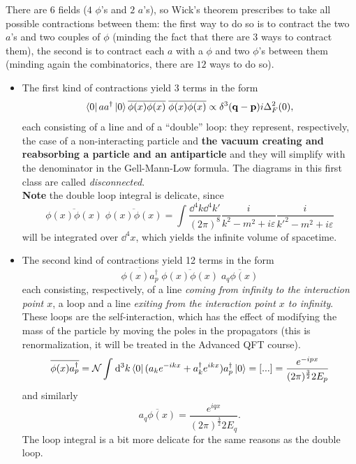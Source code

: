 There are $6$ fields ($4$ $\phi$'s and $2$ $a$'s), so Wick's theorem
prescribes to take all possible contractions between them: the first way to
do so is to contract the two $a$'s and two couples of $\phi$ (minding the fact
that there are $3$ ways to contract them), the second is to contract each $a$
with a $\phi$ and two $\phi$'s between them (minding again the combinatorics,
there are $12$ ways to do so).
\begin{itemize}
    \item The first kind of contractions yield 3 terms in the form
        $$\bra{0}aa^\dagger\ket{0}\overline{\phi(x)\phi(x)}\;\overline{\phi(x)
        \phi(x)} \propto \delta^3(\mathbf{q-p})i\Delta_F^2(0),$$
        each consisting of a line and of a ``double'' loop:
        they represent, respectively, the case of a non-interacting particle and
        \textbf{the vacuum creating and reabsorbing a particle and an
        antiparticle} and they will simplify with the denominator in the
        Gell-Mann-Low formula. The diagrams in this first class are called
        \textit{disconnected}.\\
        \textbf{Note} the double loop integral is delicate, since
        $$\overline{\phi(x)\phi(x)}\;\overline{\phi(x)\phi(x)} =
        \int \frac{\dd^4k\dd^4k'}{(2\pi)^8}\frac{i}{k^2-m^2+i\varepsilon}
        \frac{i}{k'^2-m^2+i\varepsilon}$$
        will be integrated over $\dd^4x$, which yields the infinite volume
        of spacetime.
    \item The second kind of contractions yield 12 terms in the form
        $$\overline{\phi(x)a^\dagger_p}\;\overline{\phi(x)\phi(x)}\;
        \overline{a_q\phi(x)}$$
        each consisting, respectively, of a line \textit{coming from infinity to
        the interaction point $x$}, a loop and a line \textit{exiting from
        the interaction point $x$ to infinity}. These loops are the
        self-interaction, which has the effect of modifying the mass of the
        particle by moving the poles in the propagators (this is renormalization,
        it will be treated in the Advanced QFT course).
        $$\overline{\phi(x)a^\dagger_p} =\mathcal{N}\int_{}^{} \dd^3k
        \bra{0}(a_ke^{-ikx}+a^\dagger_ke^{ikx})a^\dagger_p\ket{0} = [...]
        = \frac{e^{-ipx}}{(2\pi)^{\frac{3}{2}}2E_p}$$
        and similarly
        $$\overline{a_q\phi(x)} = \frac{e^{iqx}}{(2\pi)^\frac{3}{2}2E_q}.$$
        The loop integral is a bit more delicate for the same reasons as the
        double loop.
\end{itemize}

